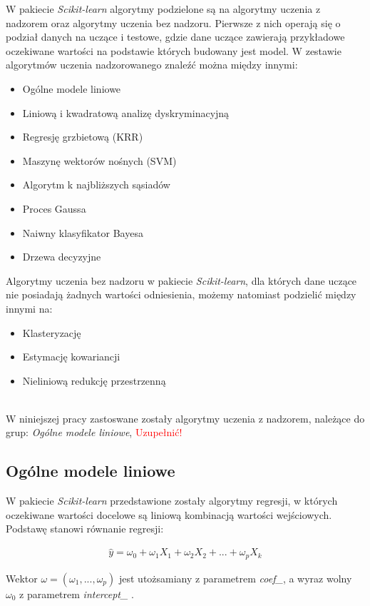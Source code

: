 W pakiecie \textit{Scikit-learn} algorytmy podzielone są na algorytmy uczenia z nadzorem oraz algorytmy uczenia bez nadzoru\cite{scikit_doc}.
Pierwsze z nich operają się o podział danych na uczące i testowe, gdzie dane uczące zawierają przykładowe oczekiwane wartości na podstawie których budowany jest model.
W zestawie algorytmów uczenia nadzorowanego znaleźć można między innymi\cite{scikit_doc}:
\begin{itemize}
 \item Ogólne modele liniowe
 \item Liniową i kwadratową analizę dyskryminacyjną
 \item Regresję grzbietową (KRR)
 \item Maszynę wektorów nośnych (SVM)
 \item Algorytm k najbliższych sąsiadów
 \item Proces Gaussa
 \item Naiwny klasyfikator Bayesa
 \item Drzewa decyzyjne
\end{itemize}

Algorytmy uczenia bez nadzoru w pakiecie \textit{Scikit-learn}, dla których dane uczące nie posiadają żadnych wartości odniesienia, możemy natomiast podzielić między innymi na:
\begin{itemize}
 \item Klasteryzację
 \item Estymację kowariancji
 \item Nieliniową redukcję przestrzenną
\end{itemize}
\\
W niniejszej pracy zastoswane zostały algorytmy uczenia z nadzorem, należące do grup: \textit{Ogólne modele liniowe}, \textcolor{red}{Uzupełnić!}

\subsection{Ogólne modele liniowe}
W pakiecie \textit{Scikit-learn} przedstawione zostały algorytmy regresji, w których oczekiwane wartości docelowe są liniową kombinacją wartości wejściowych.
Podstawę stanowi równanie regresji:
\begin{ceqn}
\begin{align}
\hat{y} = \omega_{0} + \omega_{1}X_{1} + \omega_{2}X_{2} + ... + \omega_{p}X_{k}
\end{align}
\end{ceqn}

Wektor $\omega = (\omega_{1}, ..., \omega_{p})$ jest utożsamiany z parametrem \textit{coef\_}, a wyraz wolny $\omega_{0}$ z parametrem \textit{intercept\_} \cite{scikit_doc}.

